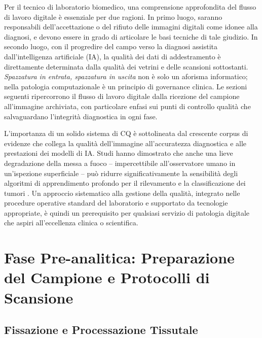 Per il tecnico di laboratorio biomedico, una comprensione approfondita del flusso di lavoro digitale
è essenziale per due ragioni. In primo luogo, saranno
responsabili dell'accettazione o del rifiuto delle immagini digitali come idonee alla diagnosi, e
devono essere in grado di articolare le basi tecniche di tale giudizio. In secondo luogo, con il
progredire del campo verso la diagnosi assistita dall'intelligenza artificiale (IA), la qualità
dei dati di addestramento è direttamente determinata dalla qualità dei vetrini e delle scansioni
sottostanti. \emph{Spazzatura in entrata, spazzatura in uscita} non è solo un aforisma
informatico; nella patologia computazionale è un principio di governance clinica. Le sezioni
seguenti ripercorrono il flusso di lavoro digitale dalla ricezione del campione all'immagine
archiviata, con particolare enfasi sui punti di controllo qualità che salvaguardano l'integrità
diagnostica in ogni fase.

L'importanza di un solido sistema di CQ è sottolineata dal crescente corpus di evidenze che
collega la qualità dell'immagine all'accuratezza diagnostica e alle prestazioni dei modelli di
IA. Studi hanno dimostrato che anche una lieve degradazione della messa a fuoco -- impercettibile
all'osservatore umano in un'ispezione superficiale -- può ridurre significativamente la
sensibilità degli algoritmi di apprendimento profondo per il rilevamento e la classificazione dei
tumori \cite{bankhead2022}. Un approccio sistematico alla gestione della qualità, integrato nelle
procedure operative standard del laboratorio e supportato da tecnologie appropriate, è quindi un
prerequisito per qualsiasi servizio di patologia digitale che aspiri all'eccellenza clinica o
scientifica.

\section{Fase Pre-analitica: Preparazione del Campione e Protocolli di Scansione}
\label{sec:ch2-preanalytical}

\subsection{Fissazione e Processazione Tissutale}

